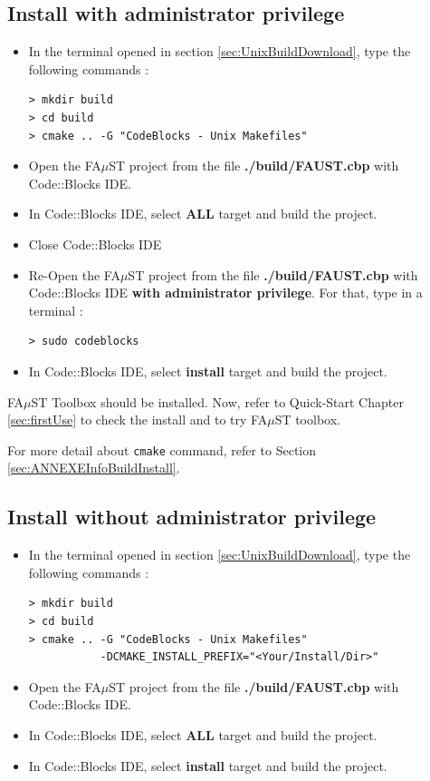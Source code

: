 \subsection{Install with administrator privilege}\label{sec:CodeBlocUnixBuildInstallAdmin}
\begin{itemize}
\item In the terminal opened in section 
\ref{sec:UnixBuildDownload}, type the following commands : 
\lstset{style=customBash}
\begin{lstlisting}
> mkdir build
> cd build
> cmake .. -G "CodeBlocks - Unix Makefiles"
\end{lstlisting}

\item Open the FA$\mu$ST project from the file \textbf{./build/FAUST.cbp} with Code::Blocks IDE. 
\item In Code::Blocks IDE, select \textbf{ALL} target and build the project. 
\item Close Code::Blocks IDE
\item Re-Open the FA$\mu$ST project from the file \textbf{./build/FAUST.cbp} with Code::Blocks IDE \textbf{with administrator privilege}. For that, type in a terminal :
\begin{lstlisting}
> sudo codeblocks
\end{lstlisting}
\item In Code::Blocks IDE, select \textbf{install} target and build the project. 
\end{itemize}

FA$\mu$ST Toolbox should be installed. Now, refer to Quick-Start Chapter \ref{sec:firstUse} to check the install and to try FA$\mu$ST toolbox.

For more detail about \texttt{cmake} command, refer to Section \ref{sec:ANNEXEInfoBuildInstall}.


\subsection{Install without administrator privilege}\label{sec:CodeBlocUnixBuildInstallNOAdmin}
\begin{itemize}
\item In the terminal opened in section 
\ref{sec:UnixBuildDownload}, type the following commands : 
\lstset{style=customBash}
\begin{lstlisting}
> mkdir build
> cd build
> cmake .. -G "CodeBlocks - Unix Makefiles"
  		   -DCMAKE_INSTALL_PREFIX="<Your/Install/Dir>"
\end{lstlisting}

\item Open the FA$\mu$ST project from the file \textbf{./build/FAUST.cbp} with Code::Blocks IDE. 
\item In Code::Blocks IDE, select \textbf{ALL} target and build the project. 
\item In Code::Blocks IDE, select \textbf{install} target and build the project. 
\end{itemize}

